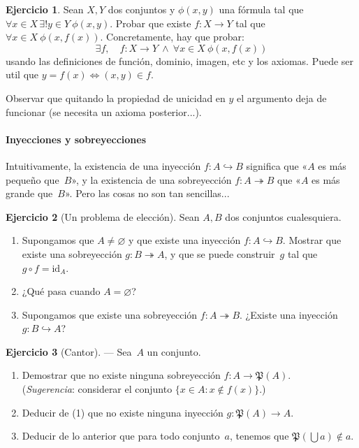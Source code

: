 \documentclass[a4paper,12pt]{book}
\newcommand{\Lra}{\Leftrightarrow}
\def\Pow{\mathfrak{P}}
\def\id{\mathrm{id}}
\def\into{\hookrightarrow}
\def\onto{\twoheadrightarrow}
\def\Pow{\mathfrak{P}}
\def\id{\mathrm{id}}
\def\into{\hookrightarrow}
\def\onto{\twoheadrightarrow}
\theoremstyle{definition}
\newtheorem{ejercicio}{Ejercicio}
\begin{document}
	\begin{ejercicio}
		Sean $X,Y$ dos conjuntos y $\phi(x,y)$ una fórmula tal que $\forall x\in X\,\exists!y\in Y~\phi(x,y)$. Probar que existe $f:X\to Y$ tal que $\forall x\in X~\phi(x,f(x))$. Concretamente, hay que probar:
		$$\exists f,\quad f:X\to Y~\wedge~\forall x\in X~\phi(x,f(x))
		$$
		usando las definiciones de función, dominio, imagen, etc y los axiomas. Puede ser util que $y=f(x)\Lra (x,y)\in f$.
		
		Observar que quitando la propiedad de unicidad en $y$ el argumento deja de funcionar (se necesita un axioma posterior...).
	\end{ejercicio}
	


	
	\paragraph*{Inyecciones y sobreyecciones}
	Intuitivamente, la existencia de una inyección $f:A\into B$ significa
	que «$A$ es más pequeño que~$B$», y la existencia de una sobreyección
	$f:A\onto B$ que «$A$ es más grande que~$B$».
	Pero las cosas no son tan sencillas...
	
	\begin{ejercicio}[Un problema de elección]
		Sean $A,B$ dos conjuntos cualesquiera.
		\begin{enumerate}
			\item[(1)] Supongamos que $A\neq\varnothing$ y que existe una
			inyección $f:A\into B$.
			Mostrar que existe una sobreyección $g:B\onto A$, y que se puede
			construir~$g$ tal que $g\circ f=\id_A$.
			\item[(2)] ¿Qué pasa cuando $A=\varnothing$?
			\item[(3)] Supongamos que existe una sobreyección $f:A\onto B$.
			¿Existe una inyección $g:B\into A$?
		\end{enumerate}

	\end{ejercicio}
	
	\begin{ejercicio}[Cantor]\label{ejer:Cantor}
		--- Sea~$A$ un conjunto.
		\begin{enumerate}
			\item[(1)] Demostrar que no existe ninguna sobreyección
			$f:A\to\Pow(A)$.\\
			(\textit{Sugerencia}: considerar el conjunto
			$\{x\in A:x\notin f(x)\}$.)
			\item[(2)] Deducir de (1) que no existe ninguna inyección
			$g:\Pow(A)\to A$.
			\item[(3)] Deducir de lo anterior que para todo conjunto~$a$,
			tenemos que $\Pow(\bigcup a)\notin a$.
		\end{enumerate}
	\end{ejercicio}
	
\end{document}
